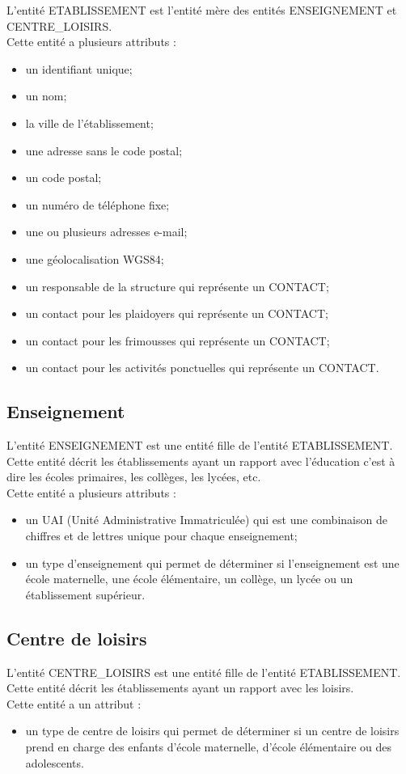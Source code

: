 \documentclass[asi, sansVersion]{picInsa}
\begin{document}
L'entité ETABLISSEMENT est l'entité mère des entités ENSEIGNEMENT et CENTRE\_LOISIRS. \\
Cette entité a plusieurs attributs : 
\begin{itemize}
\item un identifiant unique;
\item un nom;
\item la ville de l'établissement;
\item une adresse sans le code postal;
\item un code postal;
\item un numéro de téléphone fixe;
\item une ou plusieurs adresses e-mail; %
\item une géolocalisation WGS84; %
\item un responsable de la structure qui représente un CONTACT; %
\item un contact pour les plaidoyers qui représente un CONTACT; %
\item un contact pour les frimousses qui représente un CONTACT; %
\item un contact pour les activités ponctuelles qui représente un CONTACT. %
\end{itemize}

\subsection*{Enseignement}
L'entité ENSEIGNEMENT est une entité fille de l'entité ETABLISSEMENT. Cette entité décrit les établissements ayant un rapport avec l'éducation c'est à dire les écoles primaires, les collèges, les lycées, etc. \\
Cette entité a plusieurs attributs : 
\begin{itemize}
\item un UAI (Unité Administrative Immatriculée) qui est une combinaison de chiffres et de lettres unique pour chaque enseignement;
\item un type d'enseignement qui permet de déterminer si l'enseignement est une école maternelle, une école élémentaire, un collège, un lycée ou un établissement supérieur. 
\end{itemize} 


\subsection*{Centre de loisirs}
L'entité CENTRE\_LOISIRS est une entité fille de l'entité ETABLISSEMENT. Cette entité décrit les établissements ayant un rapport avec les loisirs. \\
Cette entité a un attribut : 
\begin{itemize}
\item un type de centre de loisirs qui permet de déterminer si un centre de loisirs prend en charge des enfants d'école maternelle, d'école élémentaire ou des adolescents.
\end{itemize}  
\end{document}
